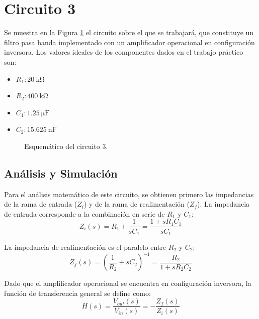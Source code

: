 \section{Circuito 3}
\label{chap:circuito_3}

Se muestra en la Figura \ref{fig:esquematico_circuito_3} el circuito sobre el que se trabajará, que constituye un filtro pasa banda
implementado con un amplificador operacional en configuración inversora. Los valores ideales de los componentes dados en el trabajo práctico son:

\begin{itemize}
  \item $R_1: \SI{20}{\kilo\ohm}$
  \item $R_2: \SI{400}{\kilo\ohm}$
  \item $C_1: \SI{1.25}{\micro\farad}$
  \item $C_2: \SI{15.625}{\nano\farad}$
\end{itemize}

\begin{figure}[H]
  \centering
  
  \caption{Esquemático del circuito 3.}
  \label{fig:esquematico_circuito_3}
\end{figure}

\subsection{Análisis y Simulación}
\label{sec:analisis_circ_3_ideal}

Para el análisis matemático de este circuito, se obtienen primero las impedancias de la rama de entrada ($Z_i$) y de la rama de realimentación ($Z_f$). 
La impedancia de entrada corresponde a la combinación en serie de $R_1$ y $C_1$:
\begin{equation}
  Z_i(s) = R_1 + \frac{1}{s C_1} = \frac{1 + s R_1 C_1}{s C_1}
\end{equation}

La impedancia de realimentación es el paralelo entre $R_2$ y $C_2$:
\begin{equation}
  Z_f(s) = \left( \frac{1}{R_2} + s C_2 \right)^{-1} = \frac{R_2}{1 + s R_2 C_2}
\end{equation}

Dado que el amplificador operacional se encuentra en configuración inversora, la función de transferencia general se define como:
\begin{equation}
  H(s) = \frac{V_{out}(s)}{V_{in}(s)} = -\frac{Z_f(s)}{Z_i(s)}
\end{equation}

